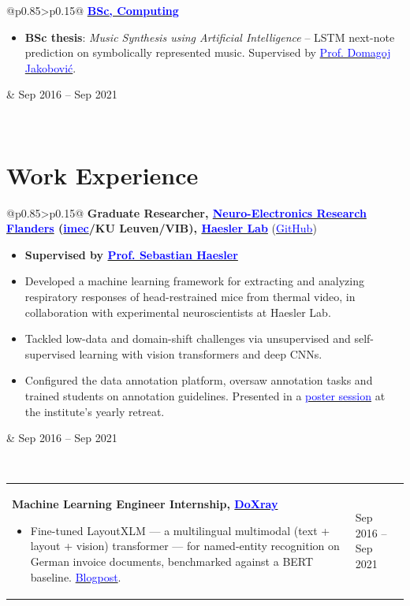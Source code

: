 \documentclass[a4paper]{article}
\makeatletter
\newlength{\tablewidth}
\newenvironment{period}[2]{%
\newcommand{\sarma}{#2}%
\setlength{\tablewidth}{\linewidth}
\addtolength{\tablewidth}{-2\tabcolsep}
\begin{tabular}{@{}p{0.85\tablewidth}>{\raggedleft\arraybackslash}p{0.15\tablewidth}@{}}%
#1 \newline
\begin{itemize}
}{%
\end{itemize} & \sarma \\%
\end{tabular}\\
}
\makeatother
\begin{document}
\vspace{-0.15em}
\begin{period}{\textbf{\href{https://www.fer.unizg.hr/en/studies/bachelor/computing}{\textcolor{blue}{BSc, Computing}}}}{Sep 2016 -- Sep 2021}
    \item \textbf{BSc thesis}: \textit{Music Synthesis using Artificial Intelligence} -- LSTM next-note prediction on symbolically represented music. Supervised by \href{https://www.zemris.fer.hr/~yeti/}{\textcolor{blue}{Prof. Domagoj Jakobovi\'{c}}}.
\end{period}


\section{Work Experience}

    \begin{period}{\textbf{Graduate Researcher, \href{https://nerf.be/en#/}{\textcolor{blue}{Neuro-Electronics Research Flanders}} (\href{https://www.imec-int.com/en}{\textcolor{blue}{imec}}/KU Leuven/VIB), \href{https://haeslerlab.sites.vib.be/en#/}{\textcolor{blue}{Haesler Lab}}} (\href{https://github.com/}{\textcolor{blue}{GitHub}})}{Mar 2023 -- Jul 2024}
        \item \textbf{Supervised by \href{https://haeslerlab.sites.vib.be/en#/}{\textcolor{blue}{Prof. Sebastian Haesler}}}
        \item Developed a machine learning framework for extracting and analyzing respiratory responses of head-restrained mice from thermal video, in collaboration with experimental neuroscientists at Haesler Lab.
        \item Tackled low-data and domain-shift challenges via unsupervised and self-supervised learning with vision transformers and deep CNNs.
        \item Configured the data annotation platform, oversaw annotation tasks and trained students on annotation guidelines. Presented in a \href{https://www.figma.com/design/SPusXHMO6yUeBIAR5LSxHE/retreat(1)?node-id=0%3A1&t=jTCQF1uwkTbBV0Az-1}{\textcolor{blue}{poster session}} at the institute's yearly retreat.
    \end{period}

    \begin{period}{\textbf{Machine Learning Engineer Internship, \href{https://site.doxray.com/}{\textcolor{blue}{DoXray}}}}{Jun 2022 -- Sep 2022}
            \item Fine-tuned LayoutXLM --- a multilingual multimodal (text + layout + vision) transformer --- for named-entity recognition on German invoice documents, benchmarked against a BERT baseline. \href{https://blog.doxray.com/p/named-entity-recognition-using-a}{\textcolor{blue}{Blogpost}}.
    \end{period}
\end{document}
